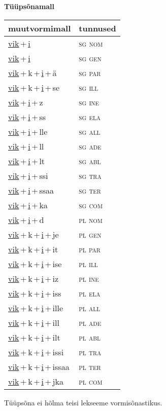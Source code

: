 
\vspace{1.8em}
\begin{minipage}{\textwidth}
\textbf{Tüüpsõnamall \,}\\

\begin{sideways}
\begin{tabular}{l l}
muutvormimall & tunnused \\
\hline
\underline{vik}\,+\,\underline{i} & \textsc{ sg nom } \\
\underline{vik}\,+\,\underline{i} & \textsc{ sg gen } \\
\underline{vik}\,+\,k\,+\,\underline{i}\,+\,ä & \textsc{ sg par } \\
\underline{vik}\,+\,k\,+\,\underline{i}\,+\,se & \textsc{ sg ill } \\
\underline{vik}\,+\,\underline{i}\,+\,z & \textsc{ sg ine } \\
\underline{vik}\,+\,\underline{i}\,+\,ss & \textsc{ sg ela } \\
\underline{vik}\,+\,\underline{i}\,+\,lle & \textsc{ sg all } \\
\underline{vik}\,+\,\underline{i}\,+\,ll & \textsc{ sg ade } \\
\underline{vik}\,+\,\underline{i}\,+\,lt & \textsc{ sg abl } \\
\underline{vik}\,+\,\underline{i}\,+\,ssi & \textsc{ sg tra } \\
\underline{vik}\,+\,\underline{i}\,+\,ssaa & \textsc{ sg ter } \\
\underline{vik}\,+\,\underline{i}\,+\,ka & \textsc{ sg com } \\
\underline{vik}\,+\,\underline{i}\,+\,d & \textsc{ pl nom } \\
\underline{vik}\,+\,k\,+\,\underline{i}\,+\,je & \textsc{ pl gen } \\
\underline{vik}\,+\,k\,+\,\underline{i}\,+\,it & \textsc{ pl par } \\
\underline{vik}\,+\,k\,+\,\underline{i}\,+\,ise & \textsc{ pl ill } \\
\underline{vik}\,+\,k\,+\,\underline{i}\,+\,iz & \textsc{ pl ine } \\
\underline{vik}\,+\,k\,+\,\underline{i}\,+\,iss & \textsc{ pl ela } \\
\underline{vik}\,+\,k\,+\,\underline{i}\,+\,ille & \textsc{ pl all } \\
\underline{vik}\,+\,k\,+\,\underline{i}\,+\,ill & \textsc{ pl ade } \\
\underline{vik}\,+\,k\,+\,\underline{i}\,+\,ilt & \textsc{ pl abl } \\
\underline{vik}\,+\,k\,+\,\underline{i}\,+\,issi & \textsc{ pl tra } \\
\underline{vik}\,+\,k\,+\,\underline{i}\,+\,issaa & \textsc{ pl ter } \\
\underline{vik}\,+\,k\,+\,\underline{i}\,+\,jka & \textsc{ pl com } \\
\end{tabular}
\end{sideways}
\label{tab:tüüpsõnamall-viki}

\end{minipage}

 
\vspace{1em}
\noindent Tüüpsõna ei hõlma teisi lekseeme vormi\-sõnastikus.
